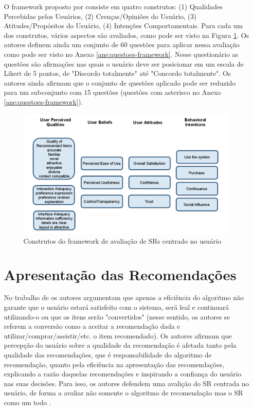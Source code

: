 O framework proposto por  consiste em quatro construtos: (1) Qualidades Percebidas pelos
Usuários, (2) Crenças/Opiniões do Usuário, (3) Atitudes/Propósitos do Usuário, (4) Intenções Comportamentais.
Para cada um dos construtos, vários aspectos são avaliados, como pode ser visto na Figura \ref{fig:resque-framework}.
Os autores definem ainda um conjunto de 60 questões para aplicar nessa avaliação como pode ser visto no Anexo
\ref{ane:questoes-framework}. Nesse questionário as questões são afirmações nas quais o usuário deve ser posicionar em
um escala de Likert de 5 pontos, de "Discordo totalmente" até "Concordo totalmente". Os autores ainda afirmam que o
conjunto de questões aplicado pode ser reduzido para um subconjunto com 15 questões (questões com asterisco no Anexo
\ref{ane:questoes-framework}).

\begin{figure}[htb]
  \caption{\label{fig:resque-framework}Construtos do framework de avaliação de SRs centrado no usuário}
  \begin{center}
      \includegraphics[scale=0.6]{./Figuras/resque-framework.png}
  \end{center}
\end{figure}

\section{Apresentação das Recomendações}

No trabalho de  os autores argumentam que apenas a eficiência do algoritmo não garante
que o usuário estará satisfeito com o sistema, será leal e continuará utilizando-o ou que os itens serão "convertidos"
(nesse sentido, os autores se referem a conversão como a aceitar a recomendação dada e utilizar/comprar/assistir/etc.
o item recomendado). Os autores afirmam que percepção do usuário sobre a qualidade da recomendação é afetada tanto pela
qualidade das recomendações, que é responsabilidade do algoritmo de recomendação, quanto pela eficiência na apresentação
das recomendações, explicando a razão daquelas recomendações e inspirando a confiança do usuário nas suas decisões.
Para isso, os autores defendem uma avalição do SR centrada no usuário, de forma a avaliar não somente o algoritmo de
recomendação mas o SR como um todo \cite{pu2012evaluating}.

